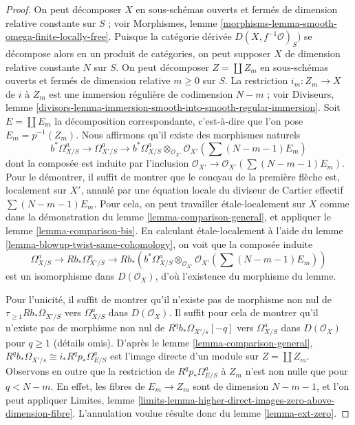 \begin{proof}
On peut décomposer $X$ en sous-schémas ouverts et fermés
de dimension relative constante sur $S$ ; voir
Morphismes, lemme \ref{morphisms-lemma-smooth-omega-finite-locally-free}.
Puisque la catégorie dérivée $D(X, f^{-1}\mathcal{O})_S)$ se décompose alors
en un produit de catégories, on peut supposer $X$ de
dimension relative constante $N$ sur $S$. On peut décomposer
$Z = \coprod Z_m$ en sous-schémas ouverts et fermés de dimension
relative $m \geq 0$ sur $S$. La restriction $i_m : Z_m \to X$ de
$i$ à $Z_m$ est une immersion régulière de codimension $N - m$ ; voir Diviseurs, lemme
\ref{divisors-lemma-immersion-smooth-into-smooth-regular-immersion}.
Soit $E = \coprod E_m$ la décomposition correspondante, c'est-à-dire
que l'on pose $E_m = p^{-1}(Z_m)$. Nous affirmons qu'il existe des morphismes naturels
$$
b^*\Omega^a_{X/S} \to \Omega^a_{X'/S} \to
b^*\Omega^a_{X/S} \otimes_{\mathcal{O}_{X'}}
\mathcal{O}_{X'}(\sum (N - m - 1)E_m)
$$
dont la composée est induite par l'inclusion
$\mathcal{O}_{X'} \to \mathcal{O}_{X'}(\sum (N - m - 1)E_m)$.
Pour le démontrer, il suffit de montrer que le
conoyau de la première flèche est, localement sur $X'$, annulé par
une équation locale du diviseur de Cartier effectif $\sum (N - m - 1)E_m$.
Pour cela, on peut travailler étale-localement sur $X$ comme dans la
démonstration du lemme \ref{lemma-comparison-general}, et appliquer
le lemme \ref{lemma-comparison-bis}.
En calculant étale-localement à l'aide du lemme \ref{lemma-blowup-twist-same-cohomology},
on voit que la composée induite
$$
\Omega^a_{X/S} \to Rb_*\Omega^a_{X'/S} \to
Rb_*\left(b^*\Omega^a_{X/S} \otimes_{\mathcal{O}_{X'}}
\mathcal{O}_{X'}(\sum (N - m - 1)E_m)\right)
$$
est un isomorphisme dans $D(\mathcal{O}_X)$,
d'où l'existence du morphisme du lemme.

\medskip\noindent
Pour l'unicité, il suffit de montrer qu'il n'existe pas de morphisme non nul de
$\tau_{\geq 1}Rb_*\Omega_{X'/S}$ vers $\Omega^a_{X/S}$ dans $D(\mathcal{O}_X)$.
Il suffit pour cela de montrer qu'il n'existe pas de morphisme non nul
de $R^qb_*\Omega_{X'/s}[-q]$ vers $\Omega^a_{X/S}$ dans $D(\mathcal{O}_X)$
pour $q \geq 1$ (détails omis). D'après
le lemme \ref{lemma-comparison-general},
$R^qb_*\Omega_{X'/s} \cong i_*R^qp_*\Omega^a_{E/S}$
est l'image directe d'un module sur $Z = \coprod Z_m$.
Observons en outre que la restriction de $R^qp_*\Omega^a_{E/S}$
à $Z_m$ n'est non nulle que pour $q < N - m$. En effet, les fibres de
$E_m \to Z_m$ sont de dimension $N - m - 1$, et l'on peut appliquer Limites, lemme
\ref{limits-lemma-higher-direct-images-zero-above-dimension-fibre}.
L'annulation voulue résulte donc du lemme \ref{lemma-ext-zero}.
\end{proof}














